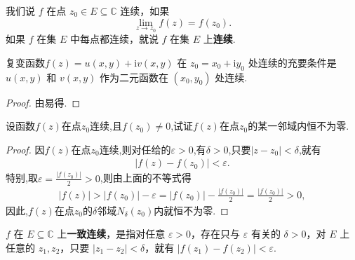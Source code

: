 \documentclass[../../main.tex]{subfiles}%
\begin{document}
\begin{definition}
我们说 $f$ 在点 $z_0 \in E\subseteq \mathbb{C}$ 连续，如果
\[
\lim_{z \to z_0} f(z) = f(z_0).
\]
如果 $f$ 在集 $E$ 中每点都连续，就说 $f$ 在集 $E$ 上\textbf{连续}.
\end{definition}

\begin{theorem}
复变函数$f(z) = u(x, y) + \mathrm{i}v(x, y)$ 在 $z_0 = x_0 + \mathrm{i}y_0$ 处连续的充要条件是 $u(x, y)$ 和 $v(x, y)$ 作为二元函数在 $(x_0, y_0)$ 处连续.
\end{theorem}
\begin{proof}

由易得.

\end{proof}

\begin{proposition}\label{proposition:复变函数---命题1.32}
设函数$f(z)$在点$z_0$连续,且$f(z_0)\neq0$,试证$f(z)$在点$z_0$的某一邻域内恒不为零.
\end{proposition}
\begin{proof}

因$f(z)$在点$z_0$连续,则对任给的$\varepsilon>0$,有$\delta>0$,只要$|z-z_0|<\delta$,就有
\begin{align*}
|f(z)-f(z_0)|<\varepsilon.
\end{align*}
特别,取$\varepsilon=\frac{|f(z_0)|}{2}>0$,则由上面的不等式得
\begin{align*}
|f(z)|>|f(z_0)|-\varepsilon=|f(z_0)|-\frac{|f(z_0)|}{2}=\frac{|f(z_0)|}{2}>0,
\end{align*}
因此,$f(z)$在点$z_0$的$\delta$邻域$N_\delta(z_0)$内就恒不为零.

\end{proof}

\begin{definition}
$f$ 在 $E\subseteq \mathbb{C}$ 上\textbf{一致连续}，是指对任意 $\varepsilon > 0$，存在只与 $\varepsilon$ 有关的 $\delta > 0$，对 $E$ 上任意的 $z_1, z_2$，只要 $|z_1 - z_2| < \delta$，就有 $|f(z_1) - f(z_2)| < \varepsilon$.
\end{definition}
\end{document}
